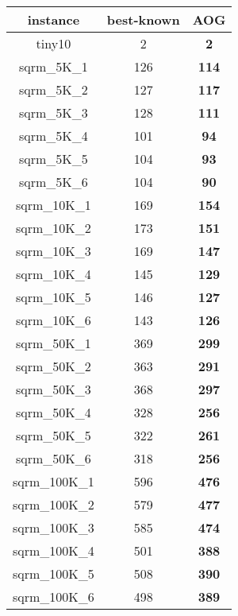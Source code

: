 \begin{tabular}{cc||c}
instance & best-known & AOG \\ 
 \hline 
tiny10           & 2                & {\bf 2}         \\ 
sqrm\_5K\_1        & 126              & {\bf 114}       \\ 
sqrm\_5K\_2        & 127              & {\bf 117}       \\ 
sqrm\_5K\_3        & 128              & {\bf 111}       \\ 
sqrm\_5K\_4        & 101              & {\bf 94}        \\ 
sqrm\_5K\_5        & 104              & {\bf 93}        \\ 
sqrm\_5K\_6        & 104              & {\bf 90}        \\ 
sqrm\_10K\_1       & 169              & {\bf 154}       \\ 
sqrm\_10K\_2       & 173              & {\bf 151}       \\ 
sqrm\_10K\_3       & 169              & {\bf 147}       \\ 
sqrm\_10K\_4       & 145              & {\bf 129}       \\ 
sqrm\_10K\_5       & 146              & {\bf 127}       \\ 
sqrm\_10K\_6       & 143              & {\bf 126}       \\ 
sqrm\_50K\_1       & 369              & {\bf 299}       \\ 
sqrm\_50K\_2       & 363              & {\bf 291}       \\ 
sqrm\_50K\_3       & 368              & {\bf 297}       \\ 
sqrm\_50K\_4       & 328              & {\bf 256}       \\ 
sqrm\_50K\_5       & 322              & {\bf 261}       \\ 
sqrm\_50K\_6       & 318              & {\bf 256}       \\ 
sqrm\_100K\_1      & 596              & {\bf 476}       \\ 
sqrm\_100K\_2      & 579              & {\bf 477}       \\ 
sqrm\_100K\_3      & 585              & {\bf 474}       \\ 
sqrm\_100K\_4      & 501              & {\bf 388}       \\ 
sqrm\_100K\_5      & 508              & {\bf 390}       \\ 
sqrm\_100K\_6      & 498              & {\bf 389}       \\ 

\end{tabular}
